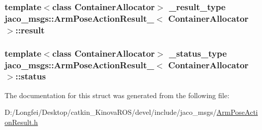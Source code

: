 \subsubsection[{\texorpdfstring{result}{result}}]{\setlength{\rightskip}{0pt plus 5cm}template$<$class Container\+Allocator$>$ {\bf \+\_\+result\+\_\+type} {\bf jaco\+\_\+msgs\+::\+Arm\+Pose\+Action\+Result\+\_\+}$<$ Container\+Allocator $>$\+::result}\hypertarget{structjaco__msgs_1_1ArmPoseActionResult___a9bb1ef2f47899c230eaa740ee2df5b09}{}\label{structjaco__msgs_1_1ArmPoseActionResult___a9bb1ef2f47899c230eaa740ee2df5b09}
\subsubsection[{\texorpdfstring{status}{status}}]{\setlength{\rightskip}{0pt plus 5cm}template$<$class Container\+Allocator$>$ {\bf \+\_\+status\+\_\+type} {\bf jaco\+\_\+msgs\+::\+Arm\+Pose\+Action\+Result\+\_\+}$<$ Container\+Allocator $>$\+::status}\hypertarget{structjaco__msgs_1_1ArmPoseActionResult___a8c41477e86f3e0e82044b11667eb0e8f}{}\label{structjaco__msgs_1_1ArmPoseActionResult___a8c41477e86f3e0e82044b11667eb0e8f}


The documentation for this struct was generated from the following file\+:\begin{DoxyCompactItemize}
\item 
D\+:/\+Longfei/\+Desktop/catkin\+\_\+\+Kinova\+R\+O\+S/devel/include/jaco\+\_\+msgs/\hyperlink{ArmPoseActionResult_8h}{Arm\+Pose\+Action\+Result.\+h}\end{DoxyCompactItemize}
